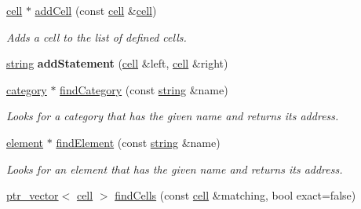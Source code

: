\begin{DoxyCompactItemize}
\item 
\hyperlink{classmbdev__ontology_1_1cell}{cell} $\ast$ \hyperlink{classmbdev__ontology_1_1ontology_a7d7f23014828019de67edb9b3a2166bb}{add\-Cell} (const \hyperlink{classmbdev__ontology_1_1cell}{cell} \&\hyperlink{classmbdev__ontology_1_1cell}{cell})
\begin{DoxyCompactList}\small\item\em \-Adds a cell to the list of defined cells. \end{DoxyCompactList}\item 
\hypertarget{classmbdev__ontology_1_1ontology_a38f19c93a3f6e817dd617fe64598c35e}{\hyperlink{classmbdev_1_1string}{string} {\bfseries add\-Statement} (\hyperlink{classmbdev__ontology_1_1cell}{cell} \&left, \hyperlink{classmbdev__ontology_1_1cell}{cell} \&right)}\label{classmbdev__ontology_1_1ontology_a38f19c93a3f6e817dd617fe64598c35e}

\item 
\hypertarget{classmbdev__ontology_1_1ontology_a27de6b3b8c0507c9b5383b16cfc23552}{\hyperlink{classmbdev__ontology_1_1category}{category} $\ast$ \hyperlink{classmbdev__ontology_1_1ontology_a27de6b3b8c0507c9b5383b16cfc23552}{find\-Category} (const \hyperlink{classmbdev_1_1string}{string} \&name)}\label{classmbdev__ontology_1_1ontology_a27de6b3b8c0507c9b5383b16cfc23552}

\begin{DoxyCompactList}\small\item\em \-Looks for a category that has the given name and returns its address. \end{DoxyCompactList}\item 
\hypertarget{classmbdev__ontology_1_1ontology_a9dae61dce79833a83c7361b72f435c44}{\hyperlink{classmbdev__ontology_1_1element}{element} $\ast$ \hyperlink{classmbdev__ontology_1_1ontology_a9dae61dce79833a83c7361b72f435c44}{find\-Element} (const \hyperlink{classmbdev_1_1string}{string} \&name)}\label{classmbdev__ontology_1_1ontology_a9dae61dce79833a83c7361b72f435c44}

\begin{DoxyCompactList}\small\item\em \-Looks for an element that has the given name and returns its address. \end{DoxyCompactList}\item 
\hypertarget{classmbdev__ontology_1_1ontology_a84485b7f8554e5998481f391c82fb758}{\hyperlink{classmbdev_1_1ptr__vector}{ptr\-\_\-vector}$<$ \hyperlink{classmbdev__ontology_1_1cell}{cell} $>$ \hyperlink{classmbdev__ontology_1_1ontology_a84485b7f8554e5998481f391c82fb758}{find\-Cells} (const \hyperlink{classmbdev__ontology_1_1cell}{cell} \&matching, bool exact=false)}\label{classmbdev__ontology_1_1ontology_a84485b7f8554e5998481f391c82fb758}


\end{DoxyCompactItemize}
